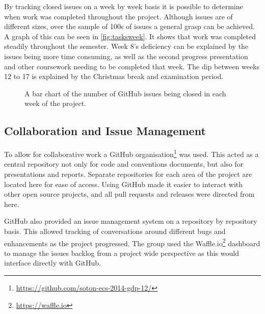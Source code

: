 By tracking closed issues on a week by week basis it is possible to determine when work was completed throughout the project. Although issues are of different sizes, over the sample of 100s of issues a general grasp can be achieved. A graph of this can be seen in \autoref{fig:tasksweek}. It shows that work was completed steadily throughout the semester. Week 8's deficiency can be explained by the issues being more time consuming, as well as the second progress presentation and other coursework needing to be completed that week. The dip between weeks 12 to 17 is explained by the Christmas break and examination period.

\begin{figure}
\centering
{}
  \caption{A bar chart of the number of GitHub issues being closed in each week of the project.}
  \label{fig:tasksweek}
\end{figure}


\subsection{Collaboration and Issue Management}
To allow for collaborative work a GitHub organisation\footnote{\url{https://github.com/soton-ecs-2014-gdp-12/}} was used. This acted as a central repository not only for code and conventions documents, but also for presentations and reports. Separate repositories for each area of the project are located here for ease of access. Using GitHub made it easier to interact with other open source projects, and all pull requests and releases were directed from here.

GitHub also provided an issue management system on a repository by repository basis. This allowed tracking of conversations around different bugs and enhancements as the project progressed. The group used the Waffle.io\footnote{\url{https://waffle.io}} dashboard to manage the issues backlog from a project wide perspective as this would interface directly with GitHub.


